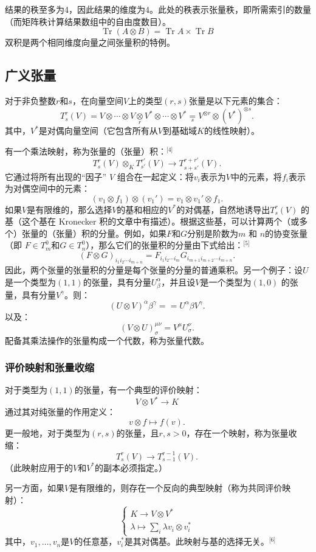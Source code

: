 结果的秩至多为4，因此结果的维度为4。此处的秩表示张量秩，即所需索引的数量（而矩阵秩计算结果数组中的自由度数目）。
\[
\operatorname{Tr} (A \otimes B) = \operatorname{Tr} A \times \operatorname{Tr} B~
\]
双积是两个相同维度向量之间张量积的特例。
\subsection{广义张量}  
对于非负整数\( r \)和\( s \)，在向量空间\( V \)上的类型\( (r, s) \)张量是以下元素的集合：
\[
T_s^r(V) = V \otimes \cdots \otimes V \underset{r}{\otimes} V^* \otimes \cdots \otimes V^* \underset{s}{= } V^{\otimes r} \otimes (V^*)^{\otimes s}.~
\]
其中，\( V^* \)是对偶向量空间（它包含所有从\( V \)到基础域\( K \)的线性映射）。

有一个乘法映射，称为张量的（张量）积：\(^\text{[4]}\)
\[
T_s^r(V) \otimes_K T_{s'}^{r'}(V) \to T_{s+s'}^{r+r'}(V).~
\]
它通过将所有出现的“因子” \( V \) 组合在一起定义：将\( v_i \)表示为\( V \)中的元素，将\( f_i \)表示为对偶空间中的元素：
\[
(v_1 \otimes f_1) \otimes (v_1') = v_1 \otimes v_1' \otimes f_1.~
\]
如果\( V \)是有限维的，那么选择\( V \)的基和相应的\( V^* \)的对偶基，自然地诱导出\( T_s^r(V) \) 的基（这个基在 Kronecker 积的文章中有描述）。根据这些基，可以计算两个（或多个）张量的（张量）积的分量。例如，如果\( F \)和\( G \)分别是阶数为\( m \) 和 \( n \)的协变张量（即 \( F \in T_m^0 \)和\( G \in T_n^0 \)），那么它们的张量积的分量由下式给出：\(^\text{[5]}\)
\[
(F \otimes G)_{i_1 i_2 \cdots i_{m+n}} = F_{i_1 i_2 \cdots i_m} G_{i_{m+1} i_{m+2} \cdots i_{m+n}}.~
\]
因此，两个张量的张量积的分量是每个张量的分量的普通乘积。另一个例子：设\( U \)是一个类型为\( (1, 1) \)的张量，具有分量\( U_{\beta}^{\alpha} \)，并且设\( V \)是一个类型为\( (1, 0) \) 的张量，具有分量\( V^{\gamma} \)。则：
\[
(U\otimes V)^{\alpha}{\beta}^{\gamma} = = U^{\alpha} {\beta} V^{\gamma}.~
\]
以及：
\[
(V \otimes U)^{\mu \nu}_{\sigma} = V^{\mu} U^{\nu}_{\sigma}.~
\]
配备其乘法操作的张量构成一个代数，称为张量代数。
\subsubsection{评价映射和张量收缩}  
对于类型为\( (1, 1) \)的张量，有一个典型的评价映射：
\[
V \otimes V^* \to K~
\]
通过其对纯张量的作用定义：
\[
v \otimes f \mapsto f(v).~
\]
更一般地，对于类型为\( (r, s) \)的张量，且\( r, s > 0 \)，存在一个映射，称为张量收缩：
\[
T_s^r(V) \to T_{s-1}^{r-1}(V).~
\]
（此映射应用于的\( V \)和\( V^* \)的副本必须指定。）

另一方面，如果\( V \)是有限维的，则存在一个反向的典型映射（称为共同评价映射）：
\[
\begin{cases}
K \to V \otimes V^* \\
\lambda \mapsto \sum_i \lambda v_i \otimes v_i^*
\end{cases}~
\]
其中，\( v_1, \dots, v_n \)是\( V \)的任意基，\( v_i^* \)是其对偶基。此映射与基的选择无关。\(^\text{[6]}\)

